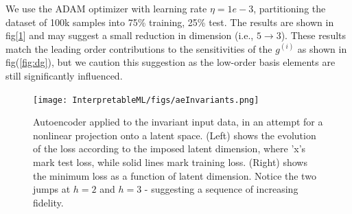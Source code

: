 We use the ADAM optimizer with learning rate $\eta = 1e-3$, partitioning the dataset of 100k samples into 75\% training, 25\% test. The results are shown in fig[\ref{fig:aeLoss}] and may suggest a small reduction in dimension (i.e., $5\to 3$). These results match the leading order contributions to the sensitivities of the $g^{(i)}$ as shown in fig(\ref{fig:dg}), but we caution this suggestion as the low-order basis elements are still significantly influenced.
\begin{figure}
    \centering
    \texttt{[image: InterpretableML/figs/aeInvariants.png]}
    \caption{Autoencoder applied to the invariant input data, in an attempt for a nonlinear projection onto a latent space. (Left) shows the evolution of the loss according to the imposed latent dimension, where 'x's mark test loss, while solid lines mark training loss. (Right) shows the minimum loss as a function of latent dimension. Notice the two jumps at $h = 2$ and $h=3$ - suggesting a sequence of increasing fidelity.}
    \label{fig:aeLoss}
\end{figure}
